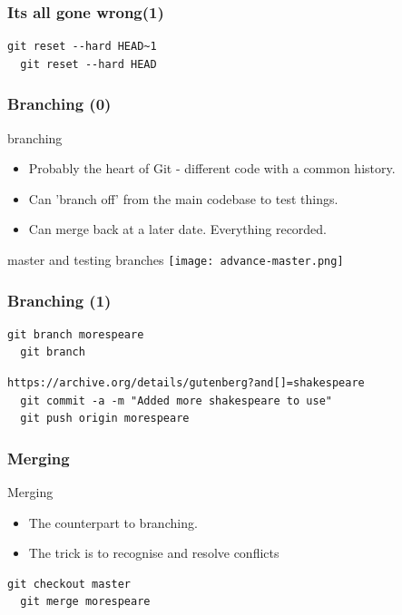 \documentclass{beamer}
\begin{document}
\begin{frame}[fragile]
  \frametitle{Its all gone wrong(1)}
  
  \begin{lstlisting}[caption=restoring things] 
  git reset --hard HEAD~1
  git reset --hard HEAD
  \end{lstlisting}

\end{frame}


\begin{frame}[fragile]
  \frametitle{Branching (0)}

  \begin{block}{branching}
   \begin{itemize}  
      \item Probably the heart of Git - different code with a common history.
      \item Can 'branch off' from the main codebase to test things.
      \item Can merge back at a later date. Everything recorded.
    \end{itemize}
  \end{block}

  \begin{block}{master and testing branches}
    \texttt{[image: advance-master.png]}
  \end{block}


\end{frame}

\begin{frame}[fragile]
  \frametitle{Branching (1)}

  \begin{lstlisting}[caption=branching] 
  git branch morespeare
  git branch
  \end{lstlisting}

  \begin{lstlisting}[caption=make some changes] 
  https://archive.org/details/gutenberg?and[]=shakespeare
  git commit -a -m "Added more shakespeare to use"
  git push origin morespeare
  \end{lstlisting}


\end{frame}

\begin{frame}[fragile]
  \frametitle{Merging}

  \begin{block}{Merging}
   \begin{itemize}  
      \item The counterpart to branching.
      \item The trick is to recognise and resolve conflicts
    \end{itemize}
  \end{block}

  \begin{lstlisting}[caption=make some changes] 
  git checkout master 
  git merge morespeare
  \end{lstlisting}

\end{frame}
\end{document}
